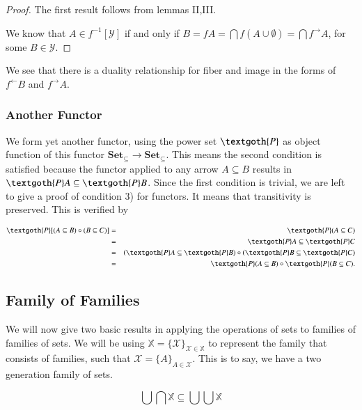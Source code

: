 \documentclass [12pt]{book}
\begin{document}
\begin{proof}The first result follows from lemmas II,III.

We know that $A\in f^{-1}[\mathcal{Y}]$ if and only if $B=fA=\bigcap f(A\cup\emptyset)=\bigcap f^{\rightarrow}A$, for some $B\in\mathcal{Y}$.\end{proof}

We see that there is a duality relationship for fiber and image in the forms of $f^\leftarrow B$ and $f^\rightarrow A$.

		\subsubsection{Another Functor}

We form yet another functor, using the power set $\textgoth{P}$ as object function of this functor $\textbf{Set}_{\subseteq}\rightarrow\textbf{Set}_{\subseteq}$. This means the second condition is satisfied because the functor applied to any arrow $A\subseteq B$ results in $\textgoth{P}A\subseteq\textgoth{P}B$. Since the first condition is trivial, we are left to give a proof of condition 3) for functors. It means that transitivity is preserved. This is verified by

\begin{eqnarray}\nonumber\textgoth{P}[(A\subseteq B)\circ(B\subseteq C)]&=&\textgoth{P}(A\subseteq C)\\\nonumber&=&\textgoth{P}A\subseteq\textgoth{P}C\\\nonumber&=&(\textgoth{P}A
\subseteq\textgoth{P}B)\circ(\textgoth{P}B\subseteq\textgoth{P}C)
\\\nonumber&=&\textgoth{P}(A\subseteq B)\circ\textgoth{P}(B\subseteq C).\end{eqnarray}

	\subsection{Family of Families}

We will now give two basic results in applying the operations of sets to families of families of sets. We will be using $\mathbb{X}=\{\mathcal{X}\}_{\mathcal{X}\in\mathbb{X}}$ to represent the family that consists of families, such that $\mathcal{X}=\{A\}_{A\in\mathcal{X}}$. This is to say, we have a two generation family of sets.

\begin{equation}\bigcup\bigcap\mathbb{X}\subseteq\bigcup\bigcup\mathbb{X}\label{ex1st}
\end{equation}
\end{document}
